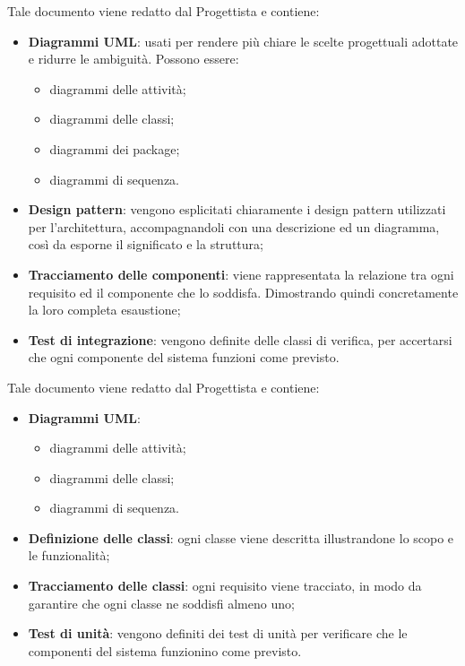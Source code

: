 	     Tale documento viene redatto dal Progettista e contiene:
	     \begin{itemize}
    	 	\item{\textbf{Diagrammi UML}: usati per rendere più chiare le scelte progettuali adottate e ridurre le ambiguità. Possono essere:
                \begin{itemize}
                    	\item{diagrammi delle attività;}
    			\item{diagrammi delle classi;}
    			\item{diagrammi dei package;}    			
				\item{diagrammi di sequenza.}                    
			\end{itemize}
			}
	
			\item{\textbf{Design pattern}: vengono esplicitati chiaramente i design pattern utilizzati per l'architettura, accompagnandoli con una descrizione ed un diagramma, così da esporne il significato e la struttura;}
			\item{\textbf{Tracciamento delle componenti}: viene rappresentata la relazione tra ogni requisito ed il componente che lo soddisfa. Dimostrando quindi concretamente la loro completa esaustione;}
			
			\item{\textbf{Test di integrazione}: vengono definite delle classi di verifica, per accertarsi che ogni componente del sistema funzioni come previsto.}
	     \end{itemize}
	     
	     Tale documento viene redatto dal Progettista e contiene:
	     \begin{itemize}
	     	\item{\textbf{Diagrammi UML}:
			\begin{itemize}
				\item{diagrammi delle attività;}
    				\item{diagrammi delle classi;}
				\item{diagrammi di sequenza.}
			\end{itemize}
			}
		\item{\textbf{Definizione delle classi}: ogni classe viene descritta illustrandone lo scopo e le funzionalità;}
		\item{\textbf{Tracciamento delle classi}: ogni requisito viene tracciato, in modo da garantire che ogni classe ne soddisfi almeno uno;}
		\item{\textbf{Test di unità}: vengono definiti dei test di unità per verificare che le componenti del sistema funzionino come previsto.}
	     \end{itemize}
	     
